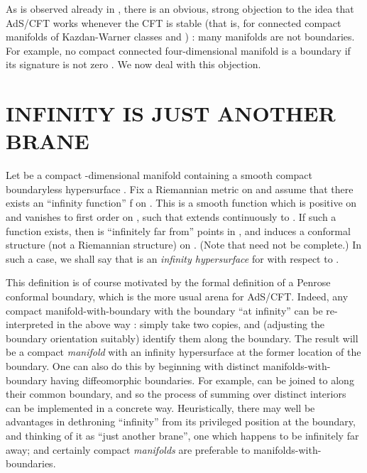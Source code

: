 \documentclass[a4paper,12pt]{article}
\theoremstyle{definition}
\renewcommand{\u}{\textit}
\renewcommand{\-}{\myHighlight{$\dfrac{\quad\enspace}{\quad}$}\coordHE{}}
\begin{document}
As is observed already in \cite{3}, there is an obvious, strong objection to the idea that AdS/CFT works whenever the CFT is stable (that is, for connected compact manifolds of Kazdan-Warner classes \coordHE{} and \coordHE{}) : many manifolds are not boundaries. For example, no compact connected four-dimensional manifold is a boundary if its signature is not zero \cite{17}. We now deal with this objection.

\section{\large INFINITY IS JUST ANOTHER BRANE}

Let \coordHE{} be a compact \coordHE{}-dimensional manifold containing a smooth compact boundaryless hypersurface \coordHE{}. Fix a Riemannian metric \coordHE{} on \coordHE{} and assume that there exists an ``infinity function'' f on \coordHE{}. This is a smooth function which is positive on \coordHE{} and vanishes to first order on \coordHE{}, such that \coordHE{} extends continuously to \coordHE{}. If such a function exists, then \coordHE{} is ``infinitely far from'' points in \coordHE{}, and \coordHE{} induces a conformal structure (not a Riemannian structure) on \coordHE{}. (Note that \coordHE{} need not be complete.) In such a case, we shall say that \coordHE{} is an \u{infinity hypersurface} for \coordHE{} with respect to \coordHE{}.

This definition is of course motivated by the formal definition \cite{15} of a Penrose conformal boundary, which is the more usual arena for AdS/CFT. Indeed, any compact manifold-with-boundary with the boundary ``at infinity'' can be re-interpreted in the above way : simply take two copies, and (adjusting the boundary orientation suitably) identify them along the boundary. The result will be a compact \u{manifold} with an infinity hypersurface at the former location of the boundary. One can also do this by beginning with distinct manifolds-with-boundary having diffeomorphic boundaries. For example, \coordHE{} can be joined to \coordHE{} along their common \coordHE{} boundary, and so the process of summing over distinct interiors \cite{3} can be implemented in a concrete way. Heuristically, there may well be advantages in dethroning ``infinity'' from its privileged position at the boundary, and thinking of it as ``just another brane'', one which happens to be infinitely far away; and certainly compact \u{manifolds} are preferable to manifolds-with-boundaries.
\end{document}
